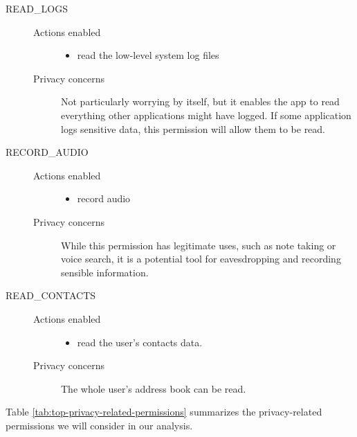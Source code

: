 \begin{description}
    \item[READ\_LOGS] \hfill
        \begin{description}
             \item[Actions enabled] \hfill
                \begin{itemize}
                    \item read the low-level system log files
                 \end{itemize} 
             \item[Privacy concerns]
                Not particularly worrying by itself, but it enables the app to read everything other applications might have logged. If some application logs sensitive data, this permission will allow them to be read.
         \end{description} 

    \item[RECORD\_AUDIO] \hfill
        \begin{description}
             \item[Actions enabled] \hfill
                \begin{itemize}
                    \item record audio
                 \end{itemize} 
             \item[Privacy concerns]
                While this permission has legitimate uses, such as note taking or voice search, it is a potential tool for eavesdropping and recording sensible information. 
         \end{description}   

    \item[READ\_CONTACTS] \hfill
        \begin{description}
             \item[Actions enabled] \hfill
                \begin{itemize}
                    \item read the user's contacts data.
                 \end{itemize} 
             \item[Privacy concerns]
                The whole user's address book can be read. 
         \end{description}  

\end{description}

Table \autoref{tab:top-privacy-related-permissions} summarizes the privacy-related permissions we will consider in our analysis.

